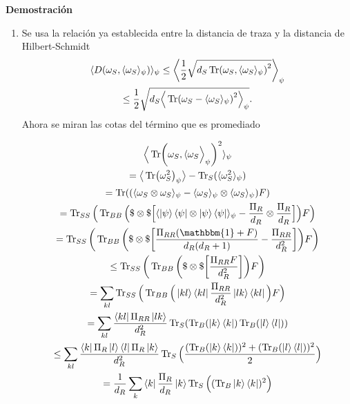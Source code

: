 \textbf{Demostración }
\begin{enumerate}

\item Se usa la relación ya establecida entre la distancia de traza y la distancia de Hilbert-Schmidt
\begin{multline}\label{a12}
\langle D(\omega_{S}, \langle \omega_{S} \rangle_{\psi}) \rangle_{\psi} \leq \bigg \langle \frac{1}{2} \sqrt{d_{S} \Tr (\omega_{S}, \langle \omega_{S} \rangle_{\psi})^{2}} \bigg \rangle_{\psi}\\
\leq \frac{1}{2} \sqrt{d_{S} \Big \langle \Tr (\omega_{S} - \langle \omega_{S} \rangle_{\psi})^{2} \Big \rangle_{\psi}}.
\end{multline}
Ahora se miran las cotas del término que es promediado

\begin{multline}
\Big \langle \Tr (\omega_{S}, \langle \omega_{S} \Big \rangle_{\psi})^{2} \rangle_{\psi} 	\\
= \big \langle \Tr(\omega_{S}^{2})_{\psi} \big \rangle - \Tr_{S} (\langle \omega_{S}^{2} \rangle_{\psi})\\
=\Tr (   (\langle \omega_{S} \otimes \omega_{S} \rangle_{\psi} - \langle \omega_{S} \rangle_{\psi} \otimes \langle \omega_{S} \rangle_{\psi} )F )\\
= \Tr_{SS} \Big( \Tr_{BB} \Big( \$ \otimes \$ \Big[ \langle \ket{\psi}\bra{\psi} \otimes  \ket{\psi}\bra{\psi}\rangle_{\psi} - \frac{\Pi_{R}}{d_{R}} \otimes  \frac{\Pi_{R}}{d_{R}}  \Big]  \Big) F \Big)\\
= \Tr_{SS} \bigg( \Tr_{BB} \bigg( \$ \otimes \$ \bigg[ \frac{\Pi_{RR}(\mathbbm{1}+F)}{d_{R}(d_{R}+1)} - \frac{\Pi_{RR}}{d_{R}^{2}}  \bigg]  \bigg) F \bigg)\\
\leq \Tr_{SS} \bigg(  \Tr_{BB} \bigg( \$ \otimes \$ \bigg[ \frac{\Pi_{RR}F}{d_{R}^{2}} \bigg] \bigg) F \bigg)\\
=  \sum_{kl}  \Tr_{SS} \Big(  \Tr_{BB} \Big( \ket{kl}\bra{kl} \frac{\Pi_{RR}}{d_{R}^{2}}  \ket{lk}\bra{kl} \Big) F \Big)\\
= \sum_{kl} \frac{\bra{kl}\Pi_{RR}\ket{lk}}{d_{R}^{2}} \Tr_{S}(\Tr_{B}(\ket{k}\bra{k}) \Tr_{B}(\ket{l}\bra{l}) )\\
\leq \sum_{kl} \frac{\bra{k}\Pi_{R}\ket{l}\bra{l}\Pi_{R}\ket{k}}{d_{R}^{2}} \Tr_{S} \Big( \frac{(\Tr_{B}(\ket{k}\bra{k}))^{2}+(\Tr_{B}(\ket{l}\bra{l}))^{2}}{2} \Big)\\
=\frac{1}{d_{R}} \sum_{k} \bra{k} \frac{\Pi_{R}}{d_{R}} \ket{k} \Tr_{S} \Big( (\Tr_{B} \ket{k}\bra{k})^{2} \Big)\\

\end{multline}
\end{enumerate}
